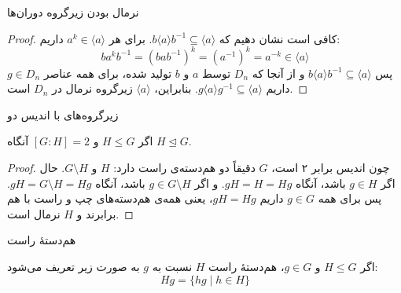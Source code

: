\begin{frame}[t]{نرمال بودن زیرگروه دوران‌ها}
    \begin{proof}
        کافی است نشان دهیم که \( b \langle a \rangle b^{-1} \subseteq \langle a \rangle \).
        برای هر \( a^k \in \langle a \rangle \) داریم:
        \[
            b a^k b^{-1} = (bab^{-1})^k = (a^{-1})^k = a^{-k} \in \langle a \rangle
        \]
        پس \( b \langle a \rangle b^{-1} \subseteq \langle a \rangle \) و از آنجا که \( D_n \) توسط \( a \) و \( b \) تولید شده، برای همه عناصر \( g \in D_n \) داریم \( g \langle a \rangle g^{-1} \subseteq \langle a \rangle \).
        بنابراین، \( \langle a \rangle \) زیرگروه نرمال در \( D_n \) است.
    \end{proof}
\end{frame}

\begin{frame}[t]{زیرگروه‌های با اندیس دو}
    \begin{theorem}
        اگر \( H \leq G \) و \( [G : H] = 2 \) آنگاه \( H \trianglelefteq G \).
    \end{theorem}

    \begin{proof}
        چون اندیس برابر ۲ است، \( G \) دقیقاً دو هم‌دسته‌ی راست دارد: \( H \) و \( G \setminus H \).
        حال اگر \( g \in H \) باشد، آنگاه \( gH = H = Hg \).
        و اگر \( g \in G \setminus H \) باشد، آنگاه \( gH = G \setminus H = Hg \).
        پس برای همه \( g \in G \) داریم \( gH = Hg \)، یعنی همه‌ی هم‌دسته‌های چپ و راست با هم برابرند و \( H \) نرمال است.
    \end{proof}
\end{frame}

\begin{frame}[t]{هم‌دستهٔ راست}
    \begin{definition}
        اگر \( H \leq G \) و \( g \in G \)، هم‌دستهٔ راست \( H \) نسبت به \( g \) به صورت زیر تعریف می‌شود:
        \[
            Hg = \{ hg \mid h \in H \}
        \]
    \end{definition}
\end{frame}


